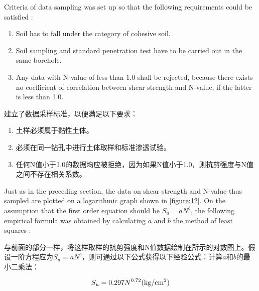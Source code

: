 \begin{paracol}{2}
    
    Criteria of data sampling was set up so that the following requirements could be satisfied :
    \begin{enumerate}
        \item Soil has to fall under the category of cohesive soil.
        \item Soil sampling and standard penetration test have to be carried out in the same borehole.
        \item Any data with N-value of less than 1.0 shall be rejected, because there exists no coefficient of correlation between shear strength and N-value, if the latter is less than 1.0.
    \end{enumerate}
    \switchcolumn

    建立了数据采样标准，以便满足以下要求：
    \begin{enumerate}
        \item 土样必须属于黏性土体。
        \item 必须在同一钻孔中进行土体取样和标准渗透试验。
        \item 任何N值小于1.0的数据均应被拒绝，因为如果N值小于1.0，则抗剪强度与N值之间不存在相关系数。
    \end{enumerate}
    
\end{paracol}


\begin{paracol}{2}
    
    Just as in the preceding section, the data on shear strength and N-value thus sampled are plotted on a logarithmic graph shown in \autoref{figure:12}. On the assumption that the first order equation should be $S_u=aN^b$, the following empirical formula was obtained by calculating $a$ and $b$ the method of least squares :

    \switchcolumn

    与前面的部分一样，将这样取样的抗剪强度和N值数据绘制在所示的对数图上。假设一阶方程应为$S_u=aN^b$，则可通过以下公式获得以下经验公式：计算$a$和$b$的最小二乘法：

\end{paracol}

\begin{align}
    S_u=0.297N^{0.72}(\rm{kg/cm^2})
    \label{equation:11}
\end{align}


